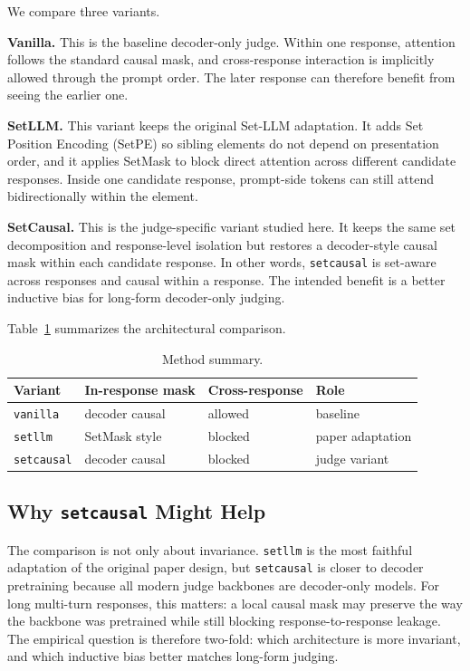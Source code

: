 \documentclass{article}
\begin{document}
We compare three variants.

\textbf{Vanilla.} This is the baseline decoder-only judge. Within one response, attention follows the standard causal mask, and cross-response interaction is implicitly allowed through the prompt order. The later response can therefore benefit from seeing the earlier one.

\textbf{SetLLM.} This variant keeps the original Set-LLM adaptation. It adds Set Position Encoding (SetPE) so sibling elements do not depend on presentation order, and it applies SetMask to block direct attention across different candidate responses. Inside one candidate response, prompt-side tokens can still attend bidirectionally within the element.

\textbf{SetCausal.} This is the judge-specific variant studied here. It keeps the same set decomposition and response-level isolation but restores a decoder-style causal mask within each candidate response. In other words, \texttt{setcausal} is set-aware across responses and causal within a response. The intended benefit is a better inductive bias for long-form decoder-only judging.

Table~\ref{tab:method-summary} summarizes the architectural comparison.

\begin{table}[t]
\centering
\small
\begin{tabular}{llll}
\toprule
Variant & In-response mask & Cross-response & Role \\
\midrule
\texttt{vanilla} & decoder causal & allowed & baseline \\
\texttt{setllm} & SetMask style & blocked & paper adaptation \\
\texttt{setcausal} & decoder causal & blocked & judge variant \\
\bottomrule
\end{tabular}
\caption{Method summary.}
\label{tab:method-summary}
\end{table}

\subsection{Why \texttt{setcausal} Might Help}

The comparison is not only about invariance. \texttt{setllm} is the most faithful adaptation of the original paper design, but \texttt{setcausal} is closer to decoder pretraining because all modern judge backbones are decoder-only models. For long multi-turn responses, this matters: a local causal mask may preserve the way the backbone was pretrained while still blocking response-to-response leakage. The empirical question is therefore two-fold: which architecture is more invariant, and which inductive bias better matches long-form judging.
\end{document}

